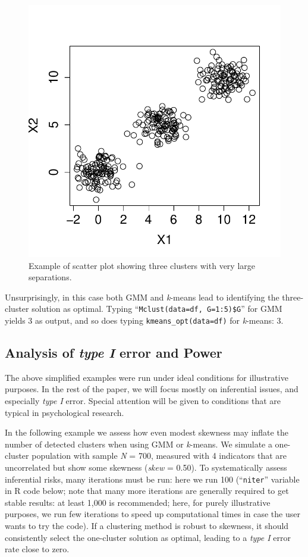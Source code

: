 \documentclass[
  man,floatsintext]{apa7}
\begin{document}
\begin{figure}

{\centering \includegraphics[width=0.5\linewidth]{paper_files/figure-latex/figure-three-cluster-example-1} 

}

\caption{Example of scatter plot showing three clusters with very large separations.}\label{fig:figure-three-cluster-example}
\end{figure}

Unsurprisingly, in this case both GMM and \emph{k}-means lead to identifying the three-cluster solution as optimal. Typing ``\texttt{Mclust(data=df,\ G=1:5)\$G}'' for GMM yields 3 as output, and so does typing \texttt{kmeans\_opt(data=df)} for \emph{k}-means: 3.

\hypertarget{analysis-of-type-i-error-and-power}{%
\subsection{\texorpdfstring{Analysis of \emph{type I} error and Power}{Analysis of type I error and Power}}\label{analysis-of-type-i-error-and-power}}

The above simplified examples were run under ideal conditions for illustrative purposes. In the rest of the paper, we will focus mostly on inferential issues, and especially \emph{type I} error. Special attention will be given to conditions that are typical in psychological research.

In the following example we assess how even modest skewness may inflate the number of detected clusters when using GMM or \emph{k}-means. We simulate a one-cluster population with sample \emph{N} = 700, measured with 4 indicators that are uncorrelated but show some skewness (\emph{skew} = 0.50). To systematically assess inferential risks, many iterations must be run: here we run 100 (``\texttt{niter}'' variable in R code below; note that many more iterations are generally required to get stable results: at least 1,000 is recommended; here, for purely illustrative purposes, we run few iterations to speed up computational times in case the user wants to try the code). If a clustering method is robust to skewness, it should consistently select the one-cluster solution as optimal, leading to a \emph{type I} error rate close to zero.
\end{document}
